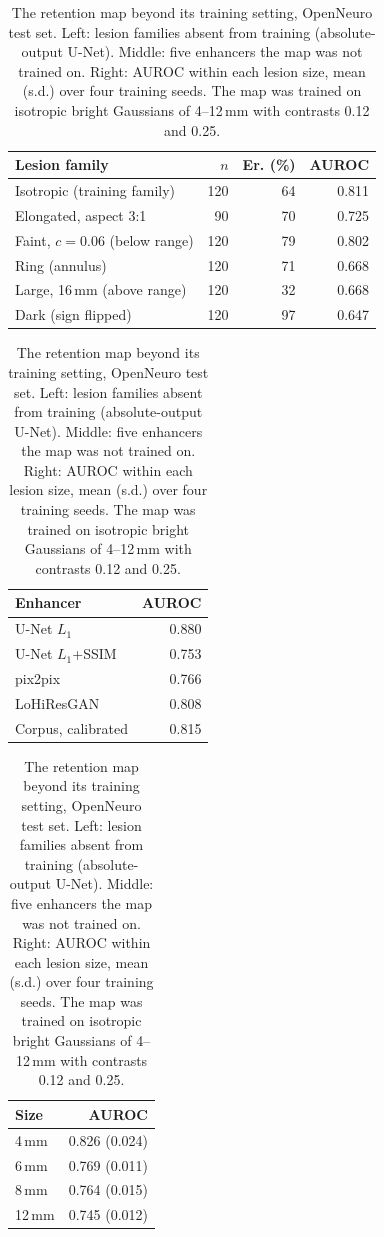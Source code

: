 \begin{table}[!htbp]
{\caption{The retention map beyond its training setting, OpenNeuro test set. Left: lesion families absent from training (absolute-output U-Net). Middle: five enhancers the map was not trained on. Right: AUROC within each lesion size, mean (s.d.) over four training seeds. The map was trained on isotropic bright Gaussians of 4--12\,mm with contrasts 0.12 and 0.25.}}
{\scriptsize\setlength{\tabcolsep}{3pt}\begin{minipage}[t]{0.46\linewidth}\begin{tabular*}{\linewidth}[t]{@{\extracolsep{\fill}}lrrr@{}}
\toprule
Lesion family & $n$ & Er. (\%) & AUROC \\
\midrule
Isotropic (training family) & 120 & 64 & 0.811 \\
Elongated, aspect 3:1 & 90 & 70 & 0.725 \\
Faint, $c=0.06$ (below range) & 120 & 79 & 0.802 \\
Ring (annulus) & 120 & 71 & 0.668 \\
Large, 16\,mm (above range) & 120 & 32 & 0.668 \\
Dark (sign flipped) & 120 & 97 & 0.647 \\
\bottomrule
\end{tabular*}\end{minipage}\hfill\begin{minipage}[t]{0.25\linewidth}\begin{tabular*}{\linewidth}[t]{@{\extracolsep{\fill}}lr@{}}
\toprule
Enhancer & AUROC \\
\midrule
U-Net $L_1$ & 0.880 \\
U-Net $L_1$+SSIM & 0.753 \\
pix2pix & 0.766 \\
LoHiResGAN & 0.808 \\
Corpus, calibrated & 0.815 \\
\bottomrule
\end{tabular*}\end{minipage}\hfill\begin{minipage}[t]{0.25\linewidth}\begin{tabular*}{\linewidth}[t]{@{\extracolsep{\fill}}lr@{}}
\toprule
Size & AUROC \\
\midrule
4\,mm & 0.826 (0.024) \\
6\,mm & 0.769 (0.011) \\
8\,mm & 0.764 (0.015) \\
12\,mm & 0.745 (0.012) \\
\bottomrule
\end{tabular*}\end{minipage}}
\end{table}
